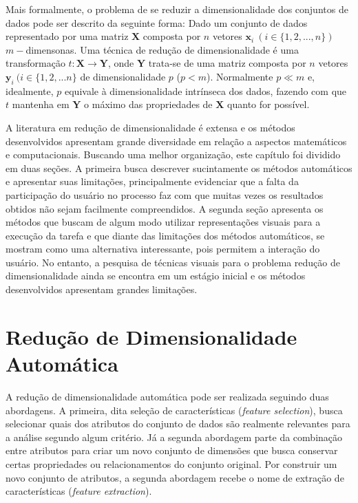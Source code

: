 Mais formalmente, o problema de se reduzir a dimensionalidade dos conjuntos de dados pode ser descrito da seguinte forma: 
Dado um conjunto de dados representado por uma matriz $\textbf{X}$ composta por $n$ vetores $\textbf{x}_i~(i \in \{1,2,...,n\})$ $m-$dimensonas. 
Uma técnica de redução de dimensionalidade é uma transformação $t: \textbf{X} \rightarrow \textbf{Y}$, onde $\textbf{Y}$ trata-se de uma matriz composta por $n$ vetores $\textbf{y}_i~(i \in \{1,2,...n\}$ de dimensionalidade $p$ ($p < m$). 
Normalmente $p \ll m$ e, idealmente, $p$ equivale à dimensionalidade intrínseca dos dados, fazendo com que $t$ mantenha em $\textbf{Y}$ o máximo das propriedades de $\textbf{X}$ quanto for possível. 

A literatura em redução de dimensionalidade é extensa e os métodos desenvolvidos apresentam grande diversidade em relação a aspectos matemáticos e computacionais. 
Buscando uma melhor organização, este capítulo foi dividido em duas seções. 
A primeira busca descrever sucintamente os métodos automáticos e apresentar suas limitações, principalmente evidenciar que a falta da participação do usuário no processo faz com que muitas vezes os resultados obtidos não sejam facilmente compreendidos. 
A segunda seção apresenta os métodos que buscam de algum modo utilizar representações visuais para a execução da tarefa e que diante das limitações dos métodos automáticos, se mostram como uma alternativa interessante, pois permitem a interação do usuário. 
No entanto, a pesquisa de técnicas visuais para o problema redução de dimensionalidade ainda se encontra em um estágio inicial e os métodos desenvolvidos apresentam grandes limitações.

\section{Redução de Dimensionalidade Automática}

A redução de dimensionalidade automática pode ser realizada seguindo duas abordagens. 
A primeira, dita seleção de características (\emph{feature selection}), busca selecionar quais dos atributos do conjunto de dados são realmente relevantes para a análise segundo algum critério. 
Já a segunda abordagem parte da combinação entre atributos para criar um novo conjunto de dimensões que busca conservar certas propriedades ou relacionamentos do conjunto original. 
Por construir um novo conjunto de atributos, a segunda abordagem recebe o nome de extração de características (\emph{feature extraction}).


